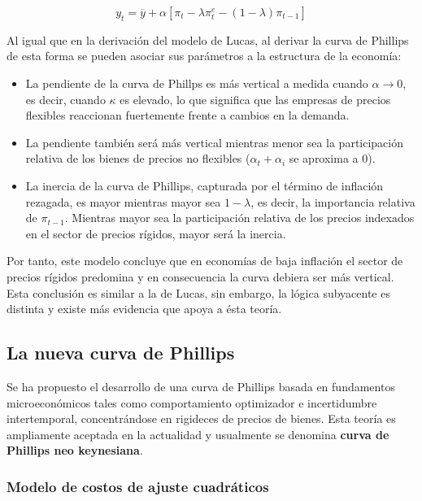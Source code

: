 \documentclass[DeGregorioResumen]{subfiles}
\begin{document}
\begin{equation}
	y_t = \overline y + \alpha[\pi_t - \lambda\pi^e_t - (1-\lambda)\pi_{t-1}]
\end{equation}

Al igual que en la derivación del modelo de Lucas, al derivar la curva de Phillips de esta forma se pueden asociar sus parámetros a la estructura de la economía:

\begin{itemize}
	\item La pendiente de la curva de Phillps es más vertical a medida cuando $\alpha \rightarrow 0$, es decir, cuando $\kappa$ es elevado, lo que significa que las empresas de precios flexibles reaccionan fuertemente frente a cambios en la demanda.
	\item La pendiente también será más vertical mientras menor sea la participación relativa de los bienes de precios no flexibles ($\alpha_t+\alpha_i$ se aproxima a 0).
	\item La inercia de la curva de Phillips, capturada por el término de inflación rezagada, es mayor mientras mayor sea $1-\lambda$, es decir, la importancia relativa de $\pi_{t-1}$. Mientras mayor sea la participación relativa de los precios indexados en el sector de precios rígidos, mayor será la inercia.
\end{itemize}

Por tanto, este modelo concluye que en economías de baja inflación el sector de precios rígidos predomina y en consecuencia la curva debiera ser más vertical. Esta conclusión es similar a la de Lucas, sin embargo, la lógica subyacente es distinta y existe más evidencia que apoya a ésta teoría. 

\subsection{La nueva curva de Phillips}

Se ha propuesto el desarrollo de una curva de Phillips basada en fundamentos microeconómicos tales como comportamiento optimizador e incertidumbre intertemporal, concentrándose en rigideces de precios de bienes. Esta teoría es ampliamente aceptada en la actualidad y usualmente se denomina \textbf{curva de Phillips neo keynesiana}.

\subsubsection{Modelo de costos de ajuste cuadráticos}
\end{document}
